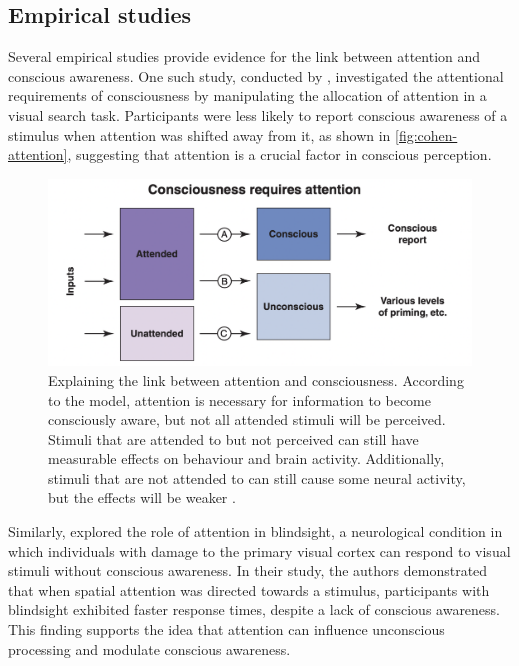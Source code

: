 \documentclass[10pt]{article}
\begin{document}
\begin{sloppypar}
  \subsection{Empirical studies}
  \label{sec:empirical}

  Several empirical studies provide evidence for the link between attention and conscious awareness. One such study, conducted by \cite{cohen_attentional_2012}, investigated the attentional requirements of consciousness by manipulating the allocation of attention in a visual search task. Participants were less likely to report conscious awareness of a stimulus when attention was shifted away from it, as shown in \autoref{fig:cohen-attention}, suggesting that attention is a crucial factor in conscious perception.

  \begin{figure}[ht]
    \centering
    \includegraphics[width=\textwidth]{figures/attention.png}
    \caption[Explaining the link between attention and consciousness. According to the model, attention is necessary for information to become consciously aware, but not all attended stimuli will be perceived. Stimuli that are attended to but not perceived can still have measurable effects on behaviour and brain activity. Additionally, stimuli that are not attended to can still cause some neural activity, but the effects will be weaker.]{Explaining the link between attention and consciousness. According to the model, attention is necessary for information to become consciously aware, but not all attended stimuli will be perceived. Stimuli that are attended to but not perceived can still have measurable effects on behaviour and brain activity. Additionally, stimuli that are not attended to can still cause some neural activity, but the effects will be weaker \citep{cohen_attentional_2012}.}
    \label{fig:cohen-attention}
  \end{figure}

  Similarly, \cite{kentridge_spatial_2004} explored the role of attention in blindsight, a neurological condition in which individuals with damage to the primary visual cortex can respond to visual stimuli without conscious awareness. In their study, the authors demonstrated that when spatial attention was directed towards a stimulus, participants with blindsight exhibited faster response times, despite a lack of conscious awareness. This finding supports the idea that attention can influence unconscious processing and modulate conscious awareness.


\end{sloppypar}
\end{document}
